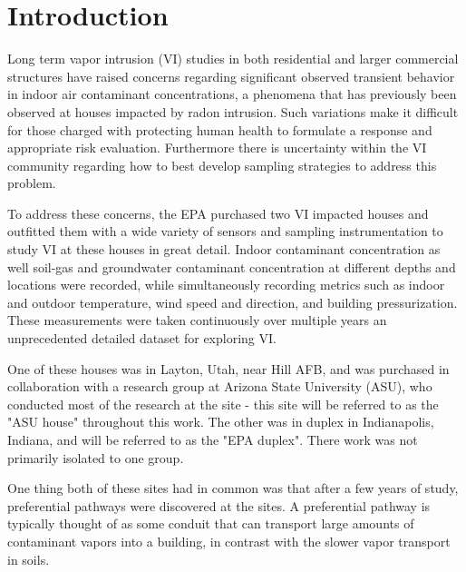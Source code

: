 \section{Introduction}\label{chp4:intro}

Long term vapor intrusion (VI) studies in both residential and larger commercial structures have raised concerns regarding significant observed transient behavior in indoor air contaminant concentrations\cite{u.s._environmental_protection_agency_oswer_2015,folkes_observed_2009,holton_temporal_2013,johnston_spatiotemporal_2014,hosangadi_high-frequency_2017,mchugh_recent_2017,u.s._environmental_protection_agency_assessment_2015}, a phenomena that has previously been observed at houses impacted by radon intrusion\cite{hubbard_time-variation_1996}.
Such variations make it difficult for those charged with protecting human health to formulate a response and appropriate risk evaluation.
Furthermore there is uncertainty within the VI community regarding how to best develop sampling strategies to address this problem\cite{u.s._environmental_protection_agency_oswer_2015,holton_temporal_2013,johnson_integrated_2016,mchugh_recent_2017}.\par

To address these concerns, the EPA purchased two VI impacted houses and outfitted them with a wide variety of sensors and sampling instrumentation to study VI at these houses in great detail.
Indoor contaminant concentration as well soil-gas and groundwater contaminant concentration at different depths and locations were recorded, while simultaneously recording metrics such as indoor and outdoor temperature, wind speed and direction, and building pressurization.
These measurements were taken continuously over multiple years an unprecedented detailed dataset for exploring VI.\par

One of these houses was in Layton, Utah, near Hill AFB, and was purchased in collaboration with a research group at Arizona State University (ASU), who conducted most of the research at the site - this site will be referred to as the "ASU house" throughout this work\cite{holton_temporal_2013}.
The other was in duplex in Indianapolis, Indiana, and will be referred to as the "EPA duplex".
There work was not primarily isolated to one group.\par

One thing both of these sites had in common was that after a few years of study, preferential pathways were discovered at the sites.
A preferential pathway is typically thought of as some conduit that can transport large amounts of contaminant vapors into a building, in contrast with the slower vapor transport in soils.\par

